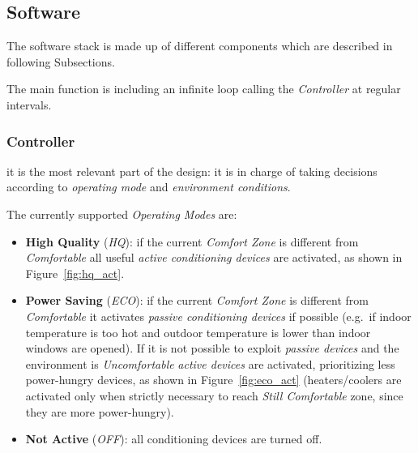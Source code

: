 \documentclass[peerreview]{IEEEtran}
\begin{document}
\subsection{Software}
The software stack is made up of different components which are described in
following Subsections.

The main function is including an infinite loop calling the \emph{Controller}
at regular intervals.

\bigskip
\subsubsection{Controller}
it is the most relevant part of the design: it is in charge of taking decisions
according to \emph{operating mode} and \emph{environment conditions}.

The currently supported \emph{Operating Modes} are:
\begin{itemize}
	\item \textbf{High Quality} (\emph{HQ}): if the current \emph{Comfort Zone}
		is different from \emph{Comfortable} all useful \emph{active
		conditioning devices} are activated, as shown in
		Figure~\ref{fig:hq_act}.
	\item \textbf{Power Saving} (\emph{ECO}): if the current \emph{Comfort
		Zone} is different from \emph{Comfortable} it activates
		\emph{passive conditioning devices} if possible (e.g.\ if indoor
		temperature is too hot and outdoor temperature is lower than
		indoor windows are opened).
		If it is not possible to exploit \emph{passive devices} and the
		environment is \emph{Uncomfortable} \emph{active devices} are
		activated, prioritizing less power-hungry devices, as shown in
		Figure~\ref{fig:eco_act} (heaters/coolers are activated only when
		strictly necessary to reach \emph{Still Comfortable} zone, since
		they are more power-hungry).
	\item \textbf{Not Active} (\emph{OFF}): all conditioning devices are
		turned off.
\end{itemize}
\end{document}
